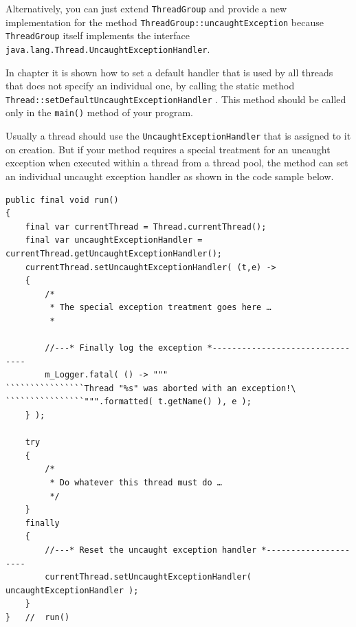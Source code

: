 Alternatively, you can just extend \lstinline|ThreadGroup| and provide a new implementation for the method \lstinline|ThreadGroup::uncaughtException| because \lstinline|ThreadGroup| itself implements the interface \lstinline|java.lang.Thread.UncaughtExceptionHandler|.

In chapter  it is shown how to set a default handler that is used by all threads that does not specify an individual one, by calling the static method \lstinline|Thread::setDefaultUncaughtExceptionHandler| \autocite{ORACLE_DOC_THREAD:setDefaultUncaughtExceptionHandler}. This method should be called only in the \lstinline|main()| method of your program.

Usually a thread should use the \lstinline|UncaughtExceptionHandler| that is assigned to it on creation. But if your method requires a special treatment for an uncaught exception when executed within a thread from a thread pool, the method can set an individual uncaught exception handler as shown in the code sample below.

\begin{lstlisting}
public final void run()
{
    final var currentThread = Thread.currentThread();
    final var uncaughtExceptionHandler = currentThread.getUncaughtExceptionHandler();
    currentThread.setUncaughtExceptionHandler( (t,e) ->
    {
        /*
         * The special exception treatment goes here …
         *

        //---* Finally log the exception *--------------------------------
        m_Logger.fatal( () -> """
````````````````Thread "%s" was aborted with an exception!\
````````````````""".formatted( t.getName() ), e );
    } );
 
    try
    {
        /*
         * Do whatever this thread must do …
         */
    }
    finally
    {
        //---* Reset the uncaught exception handler *---------------------
        currentThread.setUncaughtExceptionHandler( uncaughtExceptionHandler );
    }
}   //  run()
\end{lstlisting}

